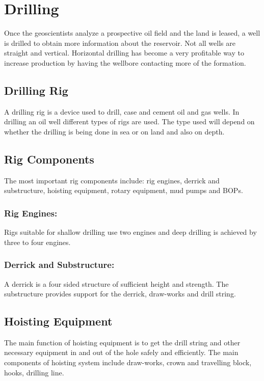 \chapter{Drilling}

Once the geoscientists analyze a prospective oil field and the land is leased,
a well is drilled to obtain more information about the reservoir. 
Not all wells are straight and vertical. Horizontal drilling has become a
 very profitable way to increase production by having the wellbore contacting more of the formation.

\section{Drilling Rig}

A drilling rig is a device used to drill, case and cement oil and gas wells. 
In drilling an oil well different types of rigs are used. The type used will
depend on whether the drilling is being done in sea or on land and also on depth.

\section{Rig Components}
The most important rig components include:
 rig engines, derrick and substructure, hoisting equipment, rotary equipment, mud pumps and BOPs.
 
 
 
 \subsection*{Rig Engines:}
 
 Rigs suitable for shallow drilling use two engines and deep drilling is achieved by three to four engines.

\subsection*{Derrick and Substructure:}

A derrick is a four sided structure of sufficient height and strength. The
substructure provides support for the derrick, draw-works and drill string.


\section{Hoisting Equipment}

The main function of hoisting equipment is to get the drill string and 
other necessary equipment in and out of the hole safely and efficiently. 
The main components of hoisting system include draw-works, crown and travelling block, hooks, drilling line.

